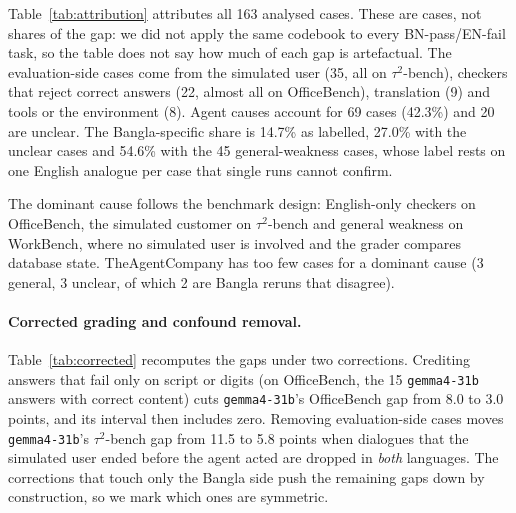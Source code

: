 \documentclass[11pt]{article}
\newcommand{\gemma}{\texttt{gemma4-31b}}
\newcommand{\OB}{OfficeBench}
\newcommand{\WB}{WorkBench}
\newcommand{\TAU}{$\tau^2$-bench}
\newcommand{\TAC}{TheAgentCompany}
\begin{document}
Table~\ref{tab:attribution} attributes all 163 analysed cases. These are cases, not shares of the
gap: we did not apply the same codebook to every BN-pass/EN-fail task, so the table does not say
how much of each gap is artefactual. The evaluation-side cases come from the simulated user
(35, all on \TAU{}), checkers that reject correct answers (22,
almost all on \OB{}), translation (9) and tools or the environment (8). Agent causes account for
69 cases (42.3\%) and 20 are unclear. The Bangla-specific share is 14.7\% as labelled, 27.0\%
with the unclear cases and 54.6\% with the 45 general-weakness cases, whose label rests on one
English analogue per case that single runs cannot confirm.

The dominant cause follows the benchmark design: English-only checkers on \OB{}, the simulated
customer on \TAU{} and general weakness on \WB{}, where no simulated user is involved and the
grader compares database state. \TAC{} has too few cases for a dominant cause (3 general, 3
unclear, of which 2 are Bangla reruns that disagree).

\paragraph{Corrected grading and confound removal.} Table~\ref{tab:corrected} recomputes the gaps
under two corrections. Crediting answers that fail only on script or digits (on \OB{}, the 15
\gemma{} answers with correct content) cuts \gemma{}'s \OB{} gap from 8.0 to 3.0 points, and its
interval then includes zero. Removing evaluation-side cases moves \gemma{}'s \TAU{} gap from 11.5
to 5.8 points when dialogues that the simulated user ended before the agent acted are dropped in
\emph{both} languages. The corrections that touch only the Bangla side push the remaining gaps
down by construction, so we mark which ones are symmetric.
\end{document}
